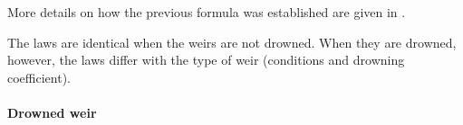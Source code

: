 \vspace{0.5cm}

More details on how the previous formula was established are given in \cite{CARLIER87}.

\vspace{0.5cm}

The laws are identical when the weirs are not drowned. When they are drowned, however, the laws differ with the type of weir (conditions and drowning coefficient).

\paragraph{Drowned weir\\}

\hspace*{1cm}

